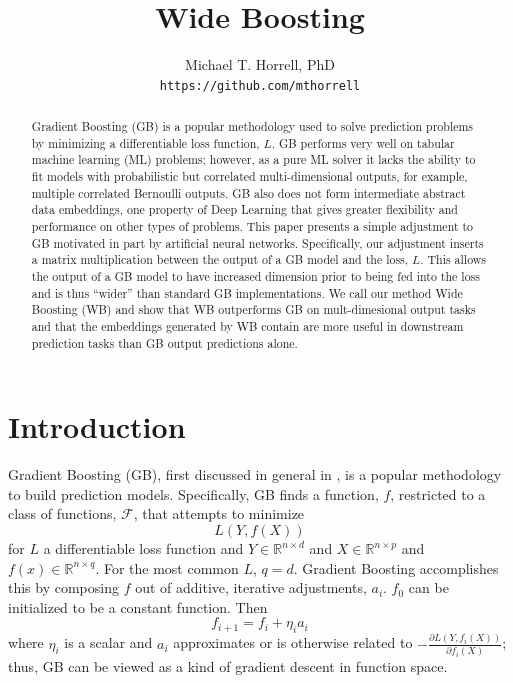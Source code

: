 \documentclass{article}
\title{Wide Boosting}
\author{%
  Michael T. Horrell, PhD \\
  \texttt{https://github.com/mthorrell}
}
\begin{document}
\maketitle

\begin{abstract}
Gradient Boosting (GB) is a popular methodology used to solve prediction problems by minimizing a differentiable loss function, $L$. GB performs very well on tabular machine learning (ML) problems; however, as a pure ML solver it lacks the ability to fit models with probabilistic but correlated multi-dimensional outputs, for example, multiple correlated Bernoulli outputs.  GB also does not form intermediate abstract data embeddings, one property of Deep Learning that gives greater flexibility and performance on other types of problems.  This paper presents a simple adjustment to GB motivated in part by artificial neural networks. Specifically, our adjustment inserts a matrix multiplication between the output of a GB model and the loss, $L$. This allows the output of a GB model to have increased dimension prior to being fed into the loss and is thus ``wider'' than standard GB implementations. We call our method Wide Boosting (WB) and show that WB outperforms GB on mult-dimesional output tasks and that the embeddings generated by WB contain are more useful in downstream prediction tasks than GB output predictions alone.
\end{abstract}

\section{Introduction}

Gradient Boosting (GB), first discussed in general in \cite{gbm}, is a popular methodology to build prediction models. Specifically, GB finds a function, $f$, restricted to a class of functions, $\mathcal{F}$, that attempts to minimize
\begin{equation}
L(Y,f(X)) \label{loss}
\end{equation}
for $L$ a differentiable loss function and $Y \in \mathbb{R}^{n \times d}$ and $X \in \mathbb{R}^{n \times p}$ and $f(x) \in \mathbb{R}^{n \times q}$. For the most common $L$, $q = d$. Gradient Boosting accomplishes this by composing $f$ out of additive, iterative adjustments, $a_i$. $f_0$ can be initialized to be a constant function. Then
\begin{equation}
    f_{i+1} = f_i + \eta_i a_i \label{iterupdate}
\end{equation} where $\eta_i$ is a scalar and $a_i$ approximates or is otherwise related to $-\frac{\partial L(Y,f_i(X))}{\partial f_i(X) }$; thus, GB can be viewed as a kind of gradient descent in function space.
\end{document}
